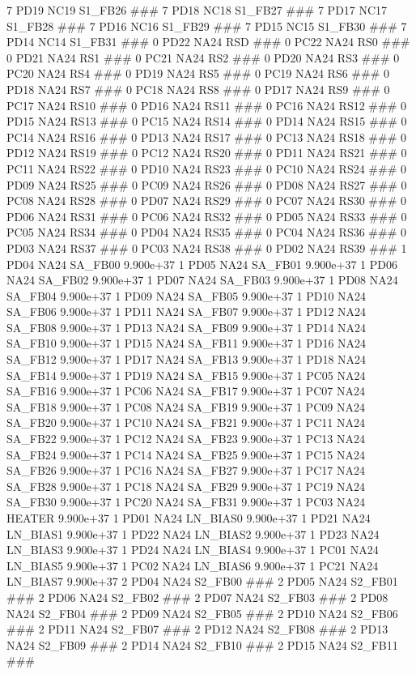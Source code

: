 7 PD19 NC19 S1_FB26 ### 
7 PD18 NC18 S1_FB27 ### 
7 PD17 NC17 S1_FB28 ### 
7 PD16 NC16 S1_FB29 ### 
7 PD15 NC15 S1_FB30 ### 
7 PD14 NC14 S1_FB31 ### 
0 PD22 NA24 RSD ### 
0 PC22 NA24 RS0 ### 
0 PD21 NA24 RS1 ### 
0 PC21 NA24 RS2 ### 
0 PD20 NA24 RS3 ### 
0 PC20 NA24 RS4 ### 
0 PD19 NA24 RS5 ### 
0 PC19 NA24 RS6 ### 
0 PD18 NA24 RS7 ### 
0 PC18 NA24 RS8 ### 
0 PD17 NA24 RS9 ### 
0 PC17 NA24 RS10 ### 
0 PD16 NA24 RS11 ### 
0 PC16 NA24 RS12 ### 
0 PD15 NA24 RS13 ### 
0 PC15 NA24 RS14 ### 
0 PD14 NA24 RS15 ### 
0 PC14 NA24 RS16 ### 
0 PD13 NA24 RS17 ### 
0 PC13 NA24 RS18 ### 
0 PD12 NA24 RS19 ### 
0 PC12 NA24 RS20 ### 
0 PD11 NA24 RS21 ### 
0 PC11 NA24 RS22 ### 
0 PD10 NA24 RS23 ### 
0 PC10 NA24 RS24 ### 
0 PD09 NA24 RS25 ### 
0 PC09 NA24 RS26 ### 
0 PD08 NA24 RS27 ### 
0 PC08 NA24 RS28 ### 
0 PD07 NA24 RS29 ### 
0 PC07 NA24 RS30 ### 
0 PD06 NA24 RS31 ### 
0 PC06 NA24 RS32 ### 
0 PD05 NA24 RS33 ### 
0 PC05 NA24 RS34 ### 
0 PD04 NA24 RS35 ### 
0 PC04 NA24 RS36 ### 
0 PD03 NA24 RS37 ### 
0 PC03 NA24 RS38 ### 
0 PD02 NA24 RS39 ### 
1 PD04 NA24 SA_FB00 9.900e+37 
1 PD05 NA24 SA_FB01 9.900e+37 
1 PD06 NA24 SA_FB02 9.900e+37 
1 PD07 NA24 SA_FB03 9.900e+37 
1 PD08 NA24 SA_FB04 9.900e+37 
1 PD09 NA24 SA_FB05 9.900e+37 
1 PD10 NA24 SA_FB06 9.900e+37 
1 PD11 NA24 SA_FB07 9.900e+37 
1 PD12 NA24 SA_FB08 9.900e+37 
1 PD13 NA24 SA_FB09 9.900e+37 
1 PD14 NA24 SA_FB10 9.900e+37 
1 PD15 NA24 SA_FB11 9.900e+37 
1 PD16 NA24 SA_FB12 9.900e+37 
1 PD17 NA24 SA_FB13 9.900e+37 
1 PD18 NA24 SA_FB14 9.900e+37 
1 PD19 NA24 SA_FB15 9.900e+37 
1 PC05 NA24 SA_FB16 9.900e+37 
1 PC06 NA24 SA_FB17 9.900e+37 
1 PC07 NA24 SA_FB18 9.900e+37 
1 PC08 NA24 SA_FB19 9.900e+37 
1 PC09 NA24 SA_FB20 9.900e+37 
1 PC10 NA24 SA_FB21 9.900e+37 
1 PC11 NA24 SA_FB22 9.900e+37 
1 PC12 NA24 SA_FB23 9.900e+37 
1 PC13 NA24 SA_FB24 9.900e+37 
1 PC14 NA24 SA_FB25 9.900e+37 
1 PC15 NA24 SA_FB26 9.900e+37 
1 PC16 NA24 SA_FB27 9.900e+37 
1 PC17 NA24 SA_FB28 9.900e+37 
1 PC18 NA24 SA_FB29 9.900e+37 
1 PC19 NA24 SA_FB30 9.900e+37 
1 PC20 NA24 SA_FB31 9.900e+37 
1 PC03 NA24 HEATER 9.900e+37 
1 PD01 NA24 LN_BIAS0 9.900e+37 
1 PD21 NA24 LN_BIAS1 9.900e+37 
1 PD22 NA24 LN_BIAS2 9.900e+37 
1 PD23 NA24 LN_BIAS3 9.900e+37 
1 PD24 NA24 LN_BIAS4 9.900e+37 
1 PC01 NA24 LN_BIAS5 9.900e+37 
1 PC02 NA24 LN_BIAS6 9.900e+37 
1 PC21 NA24 LN_BIAS7 9.900e+37 
2 PD04 NA24 S2_FB00 ### 
2 PD05 NA24 S2_FB01 ### 
2 PD06 NA24 S2_FB02 ### 
2 PD07 NA24 S2_FB03 ### 
2 PD08 NA24 S2_FB04 ### 
2 PD09 NA24 S2_FB05 ### 
2 PD10 NA24 S2_FB06 ### 
2 PD11 NA24 S2_FB07 ### 
2 PD12 NA24 S2_FB08 ### 
2 PD13 NA24 S2_FB09 ### 
2 PD14 NA24 S2_FB10 ### 
2 PD15 NA24 S2_FB11 ### 
